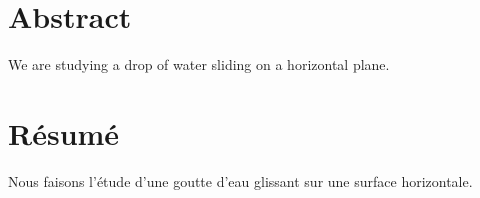 \begingroup
\let\clearpage\relax
\let\cleardoublepage\relax
\let\cleardoublepage\relax

\chapter*{Abstract}
We are studying a drop of water sliding on a horizontal plane.

\vfill


\chapter*{Résumé}
Nous faisons l'étude d'une goutte d'eau glissant sur une surface horizontale.

\endgroup

\vfill

